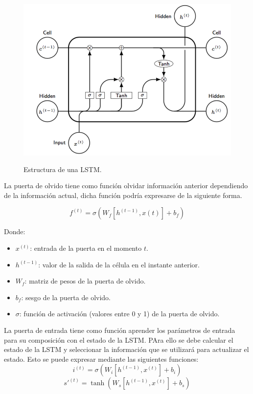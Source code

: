 \begin{figure}[h]
	\centering
	\includegraphics[width=120mm]{imagenes/lstm-struct.png}
	\label{fig:1}
	\caption{Estructura de una LSTM.}
\end{figure}
\vspace{0.09in}
La puerta de olvido tiene como función olvidar información anterior dependiendo de la información actual, dicha función podría expresarse de la siguiente forma.

$$ f^{(t)} = \sigma( W_f[h^{(t-1)}, x(t)] + b_f) $$

Donde:
\begin{itemize}
	\item $x^{(t)}$: entrada de la puerta en el momento $t$.
	\item $h^{(t-1)} $: valor de la salida de la célula en el instante anterior.
	\item $W_f $: matriz de pesos de la puerta de olvido.
	\item $b_f $: sesgo de la puerta de olvido.
	\item $\sigma$: función de activación (valores entre 0 y 1) de la puerta de olvido.
\end{itemize}
\vspace{0.09in}
La puerta de entrada tiene como función aprender los parámetros de entrada para su composición con el estado de la LSTM. PAra ello se debe calcular el estado de la LSTM y seleccionar la información que se utilizará para actualizar el estado. Esto se puede expresar mediante las siguientes funciones:\newline
$$ i^{(t)} = \sigma(W_i[h^{(t-1)}, x^{(t)}] + b_i) $$
$$ s'^{(t)} = \tanh(W_s[h^(t-1), x^{(t)}] + b_s) $$

